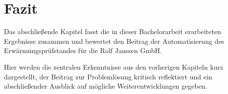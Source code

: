 \section{Fazit}
\label{chap:fazit}

Das abschließende Kapitel fasst die in dieser Bachelorarbeit erarbeiteten Ergebnisse zusammen und bewertet den Beitrag der Automatisierung des Erwärmungsprüfstandes für die Rolf Janssen GmbH.

Hier werden die zentralen Erkenntnisse aus den vorherigen Kapiteln kurz dargestellt, der Beitrag zur Problemlösung kritisch reflektiert und ein abschließender Ausblick auf mögliche Weiterentwicklungen gegeben.

